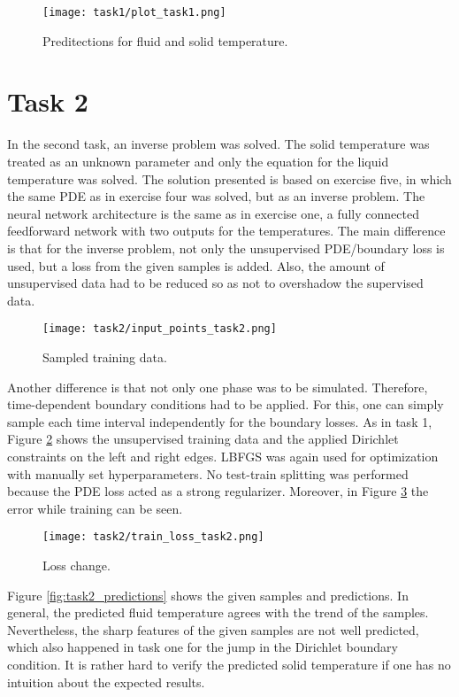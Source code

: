 \documentclass{article}
\begin{document}
\begin{figure}[ht!]
\texttt{[image: task1/plot\_task1.png]}
\caption{Preditections for fluid and solid temperature.}
\label{fig:task1_plot}
\end{figure}

\section{Task 2}
In the second task, an inverse problem was solved.
The solid temperature was treated as an unknown parameter and only the equation for the liquid temperature was solved.
The solution presented is based on exercise five, in which the same PDE as in exercise four was solved, but as an inverse problem.
The neural network architecture is the same as in exercise one, a fully connected feedforward network with two outputs for the temperatures.
The main difference is that for the inverse problem, not only the unsupervised PDE/boundary loss is used,
but a loss from the given samples is added. 
Also, the amount of unsupervised data had to be reduced so as not to overshadow the supervised data.

\begin{figure}[ht!]
\texttt{[image: task2/input\_points\_task2.png]}
\caption{Sampled training data.}
\label{fig:task2_samples}
\end{figure}

Another difference is that not only one phase was to be simulated. Therefore, time-dependent boundary conditions had to be applied.
For this, one can simply sample each time interval independently for the boundary losses.
As in task 1, Figure \ref{fig:task2_samples} shows the unsupervised training data and the applied Dirichlet constraints on the left and right edges. 
LBFGS was again used for optimization with manually set hyperparameters. No test-train splitting was performed because the PDE loss acted as a strong regularizer.
Moreover, in Figure \ref{fig:task2_loss} the error while training can be seen.

\begin{figure}[ht!]
\texttt{[image: task2/train\_loss\_task2.png]}
\caption{Loss change.}
\label{fig:task2_loss}
\end{figure}

Figure \ref{fig:task2_predictions} shows the given samples and predictions.
In general, the predicted fluid temperature agrees with the trend of the samples. 
Nevertheless, the sharp features of the given samples are not well predicted, which also happened in task one for the jump in the Dirichlet boundary condition.
It is rather hard to verify the predicted solid temperature if one has no intuition about the expected results.
\end{document}
